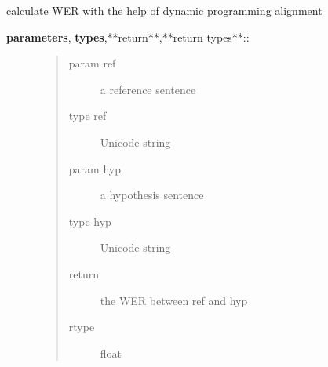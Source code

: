\documentclass[letterpaper,10pt,english]{sphinxmanual}
\begin{document}
\begin{fulllineitems}
\label{API:norm.util.calculate_wer}
calculate WER with the help of dynamic programming alignment
\begin{description}
\item[{\textbf{parameters}, \textbf{types},**return**,**return types**::}] \leavevmode\begin{quote}\begin{description}
\item[{param ref}] \leavevmode
a reference sentence

\item[{type ref}] \leavevmode
Unicode string

\item[{param hyp}] \leavevmode
a hypothesis sentence

\item[{type hyp}] \leavevmode
Unicode string

\item[{return}] \leavevmode
the WER between ref and hyp

\item[{rtype}] \leavevmode
float

\end{description}\end{quote}

\end{description}

\end{fulllineitems}

\end{document}
